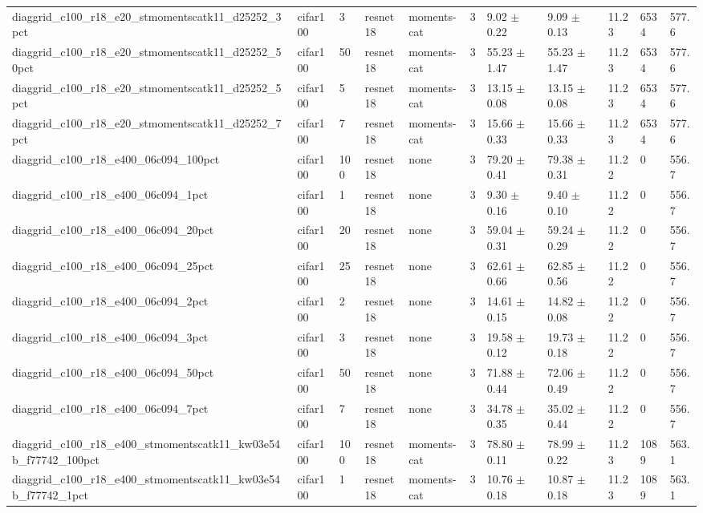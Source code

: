 \begin{tabular}{lllllllllll}
diaggrid_c100_r18_e20_stmomentscatk11_d25252_3pct & cifar100 & 3 & resnet18 & moments-cat & 3 & 9.02 $\pm$ 0.22 & 9.09 $\pm$ 0.13 & 11.23 & 6534 & 577.6 \\
diaggrid_c100_r18_e20_stmomentscatk11_d25252_50pct & cifar100 & 50 & resnet18 & moments-cat & 3 & 55.23 $\pm$ 1.47 & 55.23 $\pm$ 1.47 & 11.23 & 6534 & 577.6 \\
diaggrid_c100_r18_e20_stmomentscatk11_d25252_5pct & cifar100 & 5 & resnet18 & moments-cat & 3 & 13.15 $\pm$ 0.08 & 13.15 $\pm$ 0.08 & 11.23 & 6534 & 577.6 \\
diaggrid_c100_r18_e20_stmomentscatk11_d25252_7pct & cifar100 & 7 & resnet18 & moments-cat & 3 & 15.66 $\pm$ 0.33 & 15.66 $\pm$ 0.33 & 11.23 & 6534 & 577.6 \\
diaggrid_c100_r18_e400_06c094_100pct & cifar100 & 100 & resnet18 & none & 3 & 79.20 $\pm$ 0.41 & 79.38 $\pm$ 0.31 & 11.22 & 0 & 556.7 \\
diaggrid_c100_r18_e400_06c094_1pct & cifar100 & 1 & resnet18 & none & 3 & 9.30 $\pm$ 0.16 & 9.40 $\pm$ 0.10 & 11.22 & 0 & 556.7 \\
diaggrid_c100_r18_e400_06c094_20pct & cifar100 & 20 & resnet18 & none & 3 & 59.04 $\pm$ 0.31 & 59.24 $\pm$ 0.29 & 11.22 & 0 & 556.7 \\
diaggrid_c100_r18_e400_06c094_25pct & cifar100 & 25 & resnet18 & none & 3 & 62.61 $\pm$ 0.66 & 62.85 $\pm$ 0.56 & 11.22 & 0 & 556.7 \\
diaggrid_c100_r18_e400_06c094_2pct & cifar100 & 2 & resnet18 & none & 3 & 14.61 $\pm$ 0.15 & 14.82 $\pm$ 0.08 & 11.22 & 0 & 556.7 \\
diaggrid_c100_r18_e400_06c094_3pct & cifar100 & 3 & resnet18 & none & 3 & 19.58 $\pm$ 0.12 & 19.73 $\pm$ 0.18 & 11.22 & 0 & 556.7 \\
diaggrid_c100_r18_e400_06c094_50pct & cifar100 & 50 & resnet18 & none & 3 & 71.88 $\pm$ 0.44 & 72.06 $\pm$ 0.49 & 11.22 & 0 & 556.7 \\
diaggrid_c100_r18_e400_06c094_7pct & cifar100 & 7 & resnet18 & none & 3 & 34.78 $\pm$ 0.35 & 35.02 $\pm$ 0.44 & 11.22 & 0 & 556.7 \\
diaggrid_c100_r18_e400_stmomentscatk11_kw03e54b_f77742_100pct & cifar100 & 100 & resnet18 & moments-cat & 3 & 78.80 $\pm$ 0.11 & 78.99 $\pm$ 0.22 & 11.23 & 1089 & 563.1 \\
diaggrid_c100_r18_e400_stmomentscatk11_kw03e54b_f77742_1pct & cifar100 & 1 & resnet18 & moments-cat & 3 & 10.76 $\pm$ 0.18 & 10.87 $\pm$ 0.18 & 11.23 & 1089 & 563.1 \\

\end{tabular}
